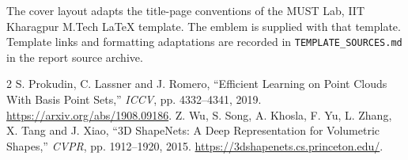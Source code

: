 \documentclass[11pt,a4paper]{article}
\begin{document}
The cover layout adapts the title-page conventions of the MUST Lab, IIT Kharagpur M.Tech LaTeX template. The emblem is supplied with that template. Template links and formatting adaptations are recorded in \texttt{TEMPLATE\_SOURCES.md} in the report source archive.

\begin{thebibliography}{2}\small
{} S. Prokudin, C. Lassner and J. Romero, ``Efficient Learning on Point Clouds With Basis Point Sets,'' \emph{ICCV}, pp. 4332--4341, 2019. \url{https://arxiv.org/abs/1908.09186}.
 Z. Wu, S. Song, A. Khosla, F. Yu, L. Zhang, X. Tang and J. Xiao, ``3D ShapeNets: A Deep Representation for Volumetric Shapes,'' \emph{CVPR}, pp. 1912--1920, 2015. \url{https://3dshapenets.cs.princeton.edu/}.
\end{thebibliography}
\end{document}
